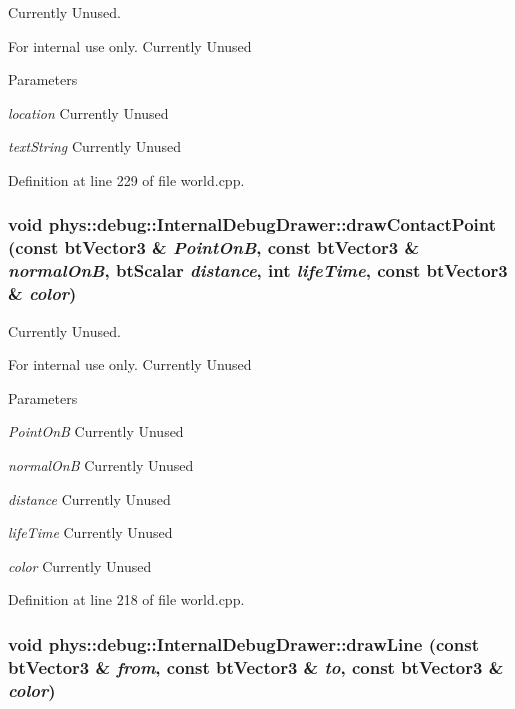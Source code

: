 Currently Unused. 

\begin{DoxyInternal}{For internal use only.}
Currently Unused 
\begin{DoxyParams}{Parameters}
\item[{\em location}]Currently Unused \item[{\em textString}]Currently Unused \end{DoxyParams}
\end{DoxyInternal}


Definition at line 229 of file world.cpp.

\hypertarget{classphys_1_1debug_1_1InternalDebugDrawer_a8b912aaff8dfd9f4e97ffb2d867121b2}{
\subsubsection[{drawContactPoint}]{\setlength{\rightskip}{0pt plus 5cm}void phys::debug::InternalDebugDrawer::drawContactPoint (const btVector3 \& {\em PointOnB}, \/  const btVector3 \& {\em normalOnB}, \/  btScalar {\em distance}, \/  int {\em lifeTime}, \/  const btVector3 \& {\em color})}}
\label{db/d27/classphys_1_1debug_1_1InternalDebugDrawer_a8b912aaff8dfd9f4e97ffb2d867121b2}


Currently Unused. 

\begin{DoxyInternal}{For internal use only.}
Currently Unused 
\begin{DoxyParams}{Parameters}
\item[{\em PointOnB}]Currently Unused \item[{\em normalOnB}]Currently Unused \item[{\em distance}]Currently Unused \item[{\em lifeTime}]Currently Unused \item[{\em color}]Currently Unused \end{DoxyParams}
\end{DoxyInternal}


Definition at line 218 of file world.cpp.

\hypertarget{classphys_1_1debug_1_1InternalDebugDrawer_a8a35c3c80fddaaec8e21f737ed1b3938}{
\subsubsection[{drawLine}]{\setlength{\rightskip}{0pt plus 5cm}void phys::debug::InternalDebugDrawer::drawLine (const btVector3 \& {\em from}, \/  const btVector3 \& {\em to}, \/  const btVector3 \& {\em color})}}
\label{db/d27/classphys_1_1debug_1_1InternalDebugDrawer_a8a35c3c80fddaaec8e21f737ed1b3938}


